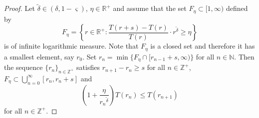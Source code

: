 \documentclass{amsart}
\newcommand{\N}{\mathbb{N}}
\newcommand{\Z}{\mathbb{Z}}
\theoremstyle{definition}
\numberwithin{equation}{section}
\numberwithin{theorem}{section}
\begin{document}
\begin{proof}
Let $\tilde\delta\in(\delta,1-\varsigma)$, $\eta\in\mathbb{R}^+$
and assume that the set $F_{\eta}\subset[1,\infty)$ defined by
    \begin{equation}\label{Fdef}
    F_{\eta}=\left\{r\in\mathbb{R}^+:
    \frac{T(r+s)-T(r)}{T(r)}\cdot r^{\tilde\delta}\geq \eta
    \right\}
    \end{equation}
is of infinite logarithmic measure. Note that $F_\eta$ is a closed
set and therefore it has a smallest element, say $r_0$. Set
$r_n=\min\{F_\eta\cap [r_{n-1}+s,\infty)\}$ for all $n\in\N$. Then
the sequence $\{r_n\}_{n\in\Z^+}$ satisfies $r_{n+1}-r_n\geq s$
for all $n\in\Z^+$, $F_\eta\subset \bigcup_{n=0}^\infty
[r_n,r_n+s]$ and
    \begin{equation}\label{assuinpr2}
    \left(1+\frac{\eta}{{r_n}^{\tilde\delta}}\right)T(r_n)\leq T(r_{n+1})
    \end{equation}
for all $n\in\Z^+$.


\end{proof}
\end{document}

